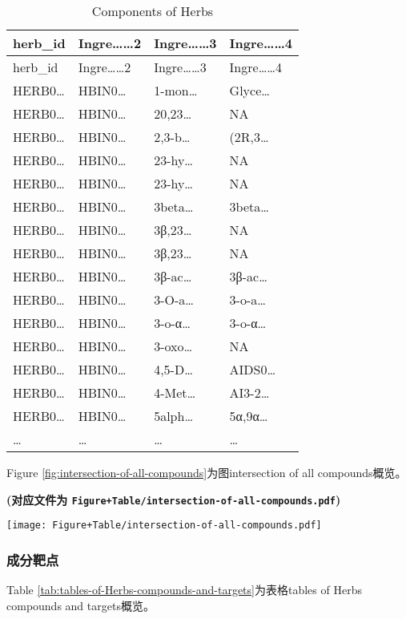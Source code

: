 \documentclass[
]{article}
\begin{document}
\begin{longtable}[]{@{}llll@{}}
\caption{\label{tab:Components-of-Herbs}Components of Herbs}\tabularnewline
\toprule
herb\_id & Ingre\ldots\ldots2 & Ingre\ldots\ldots3 & Ingre\ldots\ldots4\tabularnewline
\midrule
\endfirsthead
\toprule
herb\_id & Ingre\ldots\ldots2 & Ingre\ldots\ldots3 & Ingre\ldots\ldots4\tabularnewline
\midrule
\endhead
HERB0\ldots{} & HBIN0\ldots{} & 1-mon\ldots{} & Glyce\ldots{}\tabularnewline
HERB0\ldots{} & HBIN0\ldots{} & 20,23\ldots{} & NA\tabularnewline
HERB0\ldots{} & HBIN0\ldots{} & 2,3-b\ldots{} & (2R,3\ldots{}\tabularnewline
HERB0\ldots{} & HBIN0\ldots{} & 23-hy\ldots{} & NA\tabularnewline
HERB0\ldots{} & HBIN0\ldots{} & 23-hy\ldots{} & NA\tabularnewline
HERB0\ldots{} & HBIN0\ldots{} & 3beta\ldots{} & 3beta\ldots{}\tabularnewline
HERB0\ldots{} & HBIN0\ldots{} & 3β,23\ldots{} & NA\tabularnewline
HERB0\ldots{} & HBIN0\ldots{} & 3β,23\ldots{} & NA\tabularnewline
HERB0\ldots{} & HBIN0\ldots{} & 3β-ac\ldots{} & 3β-ac\ldots{}\tabularnewline
HERB0\ldots{} & HBIN0\ldots{} & 3-O-a\ldots{} & 3-o-a\ldots{}\tabularnewline
HERB0\ldots{} & HBIN0\ldots{} & 3-o-α\ldots{} & 3-o-α\ldots{}\tabularnewline
HERB0\ldots{} & HBIN0\ldots{} & 3-oxo\ldots{} & NA\tabularnewline
HERB0\ldots{} & HBIN0\ldots{} & 4,5-D\ldots{} & AIDS0\ldots{}\tabularnewline
HERB0\ldots{} & HBIN0\ldots{} & 4-Met\ldots{} & AI3-2\ldots{}\tabularnewline
HERB0\ldots{} & HBIN0\ldots{} & 5alph\ldots{} & 5α,9α\ldots{}\tabularnewline
\ldots{} & \ldots{} & \ldots{} & \ldots{}\tabularnewline
\bottomrule
\end{longtable}

Figure \ref{fig:intersection-of-all-compounds}为图intersection of all compounds概览。

\textbf{(对应文件为 \texttt{Figure+Table/intersection-of-all-compounds.pdf})}

\def\@captype{figure}
\begin{center}
\texttt{[image: Figure+Table/intersection-of-all-compounds.pdf]}
\caption{Intersection of all compounds}\label{fig:intersection-of-all-compounds}
\end{center}

\hypertarget{ux6210ux5206ux9776ux70b9}{%
\subsubsection{成分靶点}\label{ux6210ux5206ux9776ux70b9}}

Table \ref{tab:tables-of-Herbs-compounds-and-targets}为表格tables of Herbs compounds and targets概览。
\end{document}
